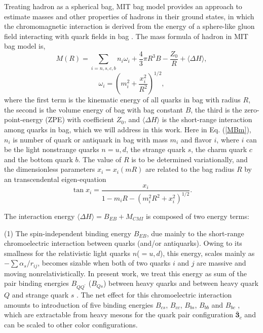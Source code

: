\documentclass[prd,twocolumn,floatfix,nofootinbib]{revtex4}
\begin{document}
Treating hadron as a spherical bag, MIT bag model provides an approach to
estimate masses and other properties of hadrons in their ground states\cite%
{Johnson:1975zp,DeGrand:1975cf}, in which the chromomagnetic interaction is
derived from the energy of a sphere-like gluon field interacting with quark
fields in bag \cite{DeGrand:1975cf}. The mass formula of hadron in MIT bag
model is,
\begin{equation}
M\left( R\right) =\sum_{i=n,s,c,b}n_{i}\omega _{i}+\frac{4}{3}\pi R^{3}B-%
\frac{Z_{0}}{R}+\langle \Delta H\rangle ,  \label{MBm}
\end{equation}%
\begin{equation}
\omega _{i}=\left( m_{i}^{2}+\frac{x_{i}^{2}}{R^{2}}\right) ^{1/2},
\label{freq}
\end{equation}%
where the first term is the kinematic energy of all quarks in bag with
radius $R$, the second is the volume energy of bag with bag constant $B$,
the third is the zero-point-energy (ZPE) with coefficient $Z_{0}$, and $%
\langle \Delta H\rangle $ is the short-range interaction among quarks in
bag, which we will address in this work. Here in Eq. (\ref{MBm}), $n_{i}$ is
number of quark or antiquark in bag with mass $m_{i}$ and flavor $i$, where $%
i$ can be the light nonstrange quarks $n=u,d$, the strange quark $s$, the
charm quark $c$ and the bottom quark $b$. The value of $R$ is to be
determined variationally, and the dimensionless parameters $x_{i}=x_{i}(mR)$
are related to the bag radius $R$ by an transcendental eigen-equation
\begin{equation}
\tan x_{i}=\frac{x_{i}}{1-m_{i}R-\left( m_{i}^{2}R^{2}+x_{i}^{2}\right)
^{1/2}}.  \label{transc}
\end{equation}

The interaction energy $\langle \Delta H \rangle=B_{EB}+ M_{CMI}$ is
composed of two energy terms:

(1) The spin-independent binding energy $B_{EB}$, due mainly to the
short-range chromoelectric interaction between quarks (and/or antiquarks).
Owing to its smallness for the relativistic light quarks $n$($=u,d$), this
energy, scales mainly as $-\sum \alpha _{s}/r_{ij}$, becomes sizable when
both of two quarks $i$ and $j$ are massive and moving nonrelativistically.
In present work, we treat this energy as sum of the pair binding energies $%
B_{QQ^{\prime }}$ ($B_{Qs}$) between heavy quarks and between heavy quark $Q$
and strange quark $s$ \cite{KR:2014gca,Karliner:2017elp,Karliner:2018bms}.
The net effect for this chromoelectric interaction amounts to introduction
of five binding energies $B_{cs}$, $B_{cc}$, $B_{bs}$, $B_{bb}$ and $B_{bc}$%
, which are extractable from heavy mesons for the quark pair configuration $%
\boldsymbol{\bar{3}}_{c}$ and can be scaled to other color configurations.
\end{document}
